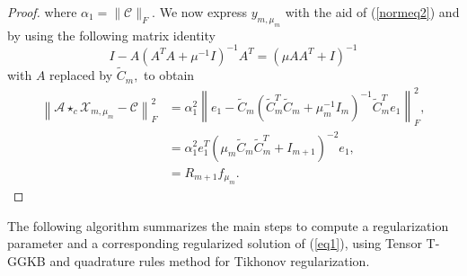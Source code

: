 \documentclass{siamltex}
\newcommand{\1}{\mathbb{1}}
\newcommand{\0}{\mathbb{0}}
\begin{document}
\begin{proof}
		where  $\alpha_{1}=\|\mathcal{C}\|_{F}$. We now express $y_{m,\mu_m}$ with the aid of  (\ref{normeq2}) and by using the following  matrix identity 
		$$I-A\left(A^{T} A+\mu^{-1} I\right)^{-1} A^{T}=\left(\mu A A^{T}+I\right)^{-1}$$
		with $A$ replaced by $\widetilde{C}_{m},$ to obtain
		$$
		\begin{aligned}
		\left\|\mathscr{A}\star_c \mathscr{X}_{m,\mu_m}-\mathscr{C}\right\|_{F}^{2} &=\alpha_{1}^{2}\left\|e_{1}-\widetilde{C}_{m}\left(\widetilde{C}_{m}^{T} \widetilde{C}_{m}+\mu_{m}^{-1} I_{m}\right)^{-1} \widetilde{C}_{m}^{T} e_{1}\right\|_{F}^{2}, \\
		&=\alpha_{1}^{2} e_{1}^{T}\left(\mu_{m} \widetilde{C}_{m} \widetilde{C}_{m}^{T}+I_{m+1}\right)^{-2} e_{1}, \\
		&=R_{m+1} f_{\mu_{m}}.
		\end{aligned}
		$$
	\end{proof}
	
	\noindent  The following algorithm summarizes the main steps to compute a regularization parameter and a corresponding regularized solution of (\ref{eq1}), using  Tensor T-GGKB and quadrature rules method for Tikhonov regularization.
	
\end{document}
